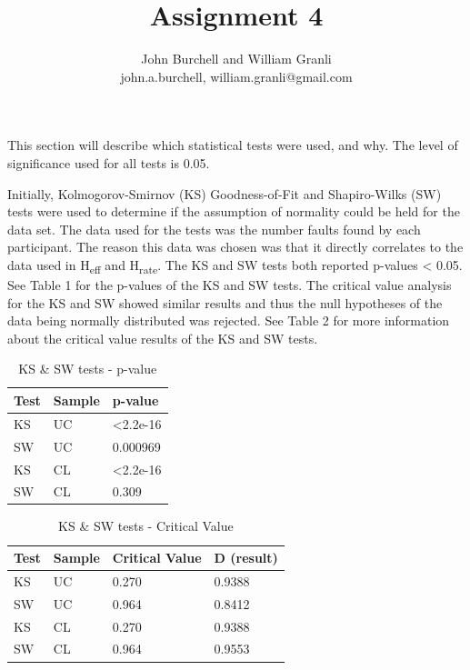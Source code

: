 \documentclass[10pt,twocolumn]{article}
\begin{document}
\title{Assignment 4}

\author{John Burchell and William Granli \\
john.a.burchell, william.granli@gmail.com}


\maketitle
\thispagestyle{empty}



This section will describe which statistical tests were used, and why. The level of significance used for all tests is 0.05. 

Initially, Kolmogorov-Smirnov (KS) Goodness-of-Fit and Shapiro-Wilks (SW) tests were used to determine if the assumption of normality could be held for the data set. The data used for the tests was the number faults found by each participant. The reason this data was chosen was that it directly correlates to the data used in H\textsubscript{eff} and H\textsubscript{rate}. The KS and SW tests both reported p-values < 0.05. See Table 1 for the p-values of the KS and SW tests. The critical value analysis for the KS and SW showed similar results and thus the null hypotheses of the data being normally distributed was rejected. See Table 2 for more information about the critical value results of the KS and SW tests.

\begin{table}
	\centering
	\begin{tabular}[Ht]{| l | l | l |}
	\hline
	Test & Sample & p-value  \\
	\hline
	KS & UC & \textless 2.2e-16 \\
	\hline
	SW & UC & 0.000969 \\
	\hline
	KS & CL & \textless 2.2e-16 \\
	\hline
	SW & CL & 0.309 \\	
	\hline
	\end{tabular}
	\caption{KS \& SW tests - p-value}
\end{table}


\begin{table}
	\centering
	\begin{tabular}[Ht]{| l | l | l | l |}
	\hline
	Test & Sample & Critical Value & D (result)  \\
	\hline
	KS & UC & 0.270 & 0.9388 \\
	\hline
	SW & UC & 0.964 &  0.8412 \\
	\hline
	KS & CL & 0.270 & 0.9388 \\
	\hline
	SW & CL & 0.964 & 0.9553 \\	
	\hline
	\end{tabular}
	\caption{KS \& SW tests - Critical Value}
\end{table}
\end{document}
